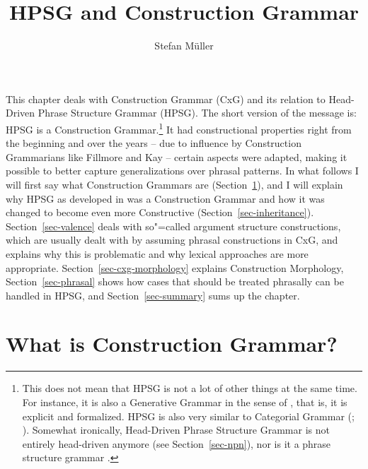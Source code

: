 \documentclass[output=paper,biblatex,babelshorthands,newtxmath,draftmode,colorlinks,citecolor=brown]{langscibook}
\author{Stefan Müller\orcid{0000-0003-4413-5313}\affiliation{Humboldt-Universität zu Berlin}}
\title{HPSG and Construction Grammar}
\begin{document}
\maketitle
\label{firstpage-cxg}\label{chap-cxg}
\indexcxgstart



\noindent
This chapter deals with Construction Grammar (CxG) and its relation to Head-Driven Phrase Structure
Grammar (HPSG). The short version of the message is: HPSG is a Construction Grammar.\footnote{%
  This does not mean that HPSG is not a lot of other things at the same time. For instance, it is
  also a Generative Grammar in the sense of \citet[]{Chomsky65a}, that is, it is explicit and
  formalized. HPSG is also very similar to Categorial Grammar (\citealt{MuellerUnifying};
  ). Somewhat ironically, Head-Driven Phrase Structure Grammar is not entirely
  head-driven anymore (see Section~\ref{sec-npn}), nor is it a phrase structure grammar .
}
It had constructional properties right from the beginning\label{page-HPSG-always-was-constructional} and over the years -- due to influence by
Construction Grammarians like Fillmore and Kay -- certain aspects were adapted, making it possible to better
capture generalizations over phrasal patterns. In what follows I will first say what Construction
Grammars are (Section~\ref{sec-cxg}), and I will explain why HPSG as developed in  was a
Construction Grammar and how it was changed to become even more Constructive
(Section~\ref{sec-inheritance}). Section~\ref{sec-valence} deals with so"=called argument structure
constructions, which are usually dealt with by assuming phrasal constructions in CxG, and explains
why this is problematic and why lexical approaches are more appropriate. Section~\ref{sec-cxg-morphology} explains
Construction Morphology, Section~\ref{sec-phrasal} shows how cases that should be treated phrasally
can be handled in HPSG, and Section~\ref{sec-summary} sums up the chapter.

\section{What is Construction Grammar?}
\label{sec-cxg}
\end{document}
